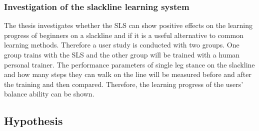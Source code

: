 \subsubsection{Investigation of the slackline learning system}
The thesis investigates whether the SLS can show positive effects on the learning progress of beginners on a slackline and if it is a  useful alternative to common learning methods.
Therefore a user study is conducted with two groups.
One group trains with the SLS and the other group will be trained with a human personal trainer.
The performance parameters of single leg stance on the slackline and how many steps they can walk on the line will be measured before and after the training and then compared.
Therefore, the learning progress of the users' balance ability can be shown.


\begin{comment}
- Investigate related system

- Requirement analysis

- Conceptual design of an interactive feedback system for slacklining
-- Provide supportive feedback

- User interface design

- Integration

- Investigation of the system
\end{comment}
\subsection{Hypothesis}
\begin{comment}

- Show if an interactive real time feedback system is usable for this kind of sport

- If the learning progress is comparable with other training methods like human trainer

- If such a system motivates user for slackline exercises
\end{comment}
